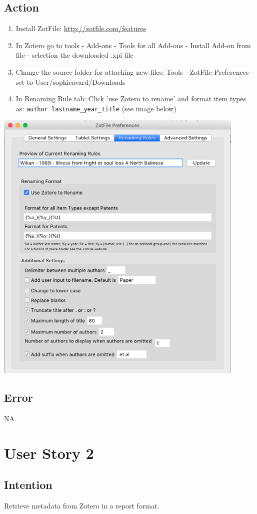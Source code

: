 \documentclass{article}
\begin{document}
\subsection{Action}
\begin{enumerate}
    \item Install ZotFile: \href{http://zotfile.com/#features}{http://zotfile.com/features}  
    \item In Zotero go to tools - Add-ons - Tools for all Add-ons - Install Add-on from file - selection the downloaded .xpi file
    \item Change the source folder for attaching new files: Tools - ZotFile Preferences - set to User/sophieavard/Downloads
    \item In Renaming Rule tab: Click 'use Zotero to rename' and format item types as: \verb|author lastname_year_title| (see image below)
\end{enumerate}
   \includegraphics[width=12cm]{zotfile.png}
\subsection{Error}
NA. 
\section{User Story 2}
\subsection{Intention}
Retrieve metadata from Zotero in a report format. 
\end{document}
